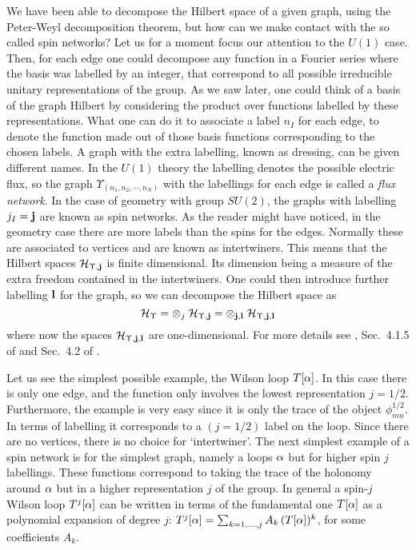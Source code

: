 \documentclass[aps,prd,tightenlines,showpacs,nofootinbib,preprint]{revtex4}
\def\be{\begin{equation}}
\def\ee{\end{equation}}
\begin{document}
We have been able to decompose the Hilbert space of a given graph,
using the Peter-Weyl decomposition theorem, but how can we make
contact with the so called spin networks? Let us for a moment
focus our attention to the $U(1)$ case. Then, for each edge one
could decompose any function in a Fourier series where the basis
was labelled by an integer, that correspond to all possible
irreducible unitary representations of the group. As we saw later,
one could think of a basis of the graph Hilbert by considering the
product over functions labelled by these representations. What one
can do it to associate a label $n_I$ for each edge, to denote the
function made out of those basis functions corresponding to the
chosen labels. A graph with the extra labelling, known as
dressing, can be given different names. In the $U(1)$ theory the
labelling denotes the possible electric flux, so the graph
$\Upsilon_{(n_1,n_2,\cdots,n_N)}$ with the labellings for each
edge is called a {\it flux network}. In the case of geometry with
group $SU(2)$, the graphs with labelling $j_I={\bf j}$ are known
as spin networks. As the reader might have noticed, in the
geometry case there are more labels than the spins for the edges.
Normally these are associated to vertices and are known as
intertwiners. This means that the Hilbert spaces ${\cal
H}_{\Upsilon,{\bf j}}$ is finite dimensional. Its dimension being
a measure of the extra freedom contained in the intertwiners. One
could then introduce further labelling $\bf l$ for the graph, so
we can decompose the Hilbert space as
%
\be
{\cal H}_\Upsilon=\otimes_j\;{\cal H}_{\Upsilon,{\bf
j}}=\otimes_{{\bf j},{\bf l}}\;{\cal H}_{\Upsilon,{\bf j},{\bf l}}
\ee
%
where now the spaces ${\cal H}_{\Upsilon,{\bf j},{\bf l}}$ are
one-dimensional. For more details see \cite{baez2}, Sec.~4.1.5 of
\cite{Perez:2004hj} and Sec.~4.2 of \cite{AL:review}.


Let us see the simplest possible example, the Wilson loop $T[{\alpha}]$.
In this case there is only one edge, and the function only
involves the lowest representation $j=1/2$. Furthermore, the
example is very easy since it is only the trace of the object
$\phi^{1/2}_{m n}$. In terms of labelling it corresponds to a
$(j=1/2)$ label on the loop. Since there are no vertices, there is
no choice for `intertwiner'. The next simplest example of a spin
network is for the simplest graph, namely a loops ${\alpha}$ but for
higher spin $j$ labellings. These functions correspond to taking
the trace of the holonomy around ${\alpha}$ but in a higher
representation $j$ of the group. In general a spin-$j$ Wilson loop
$T^j[{\alpha}]$ can be written in terms of the fundamental one $T[{\alpha}]$
as a polynomial expansion of degree $j$:
$T^j[{\alpha}]=\sum_{k=1,\ldots,j}A_k\,(T[{\alpha}])^k$, for some coefficients
$A_k$.
\end{document}
